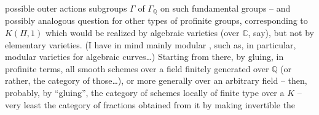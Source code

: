 possible outer actions   subgroups $\Gamma$ of $\Gamma_{\mathbb{Q}}$ on such fundamental groups -- and possibly analogous question for other types of profinite groups, corresponding to $K(\Pi,1)$ which would be realized by algebraic varieties (over $\mathbb{C}$, say), but not by elementary varieties. (I have in mind mainly modular  , such as, in particular, modular varieties for algebraic curves\ldots) Starting from there,   by gluing, in profinite terms, all smooth schemes over a field finitely generated over $\mathbb{Q}$ (or rather, the category of those\ldots), or more generally over an arbitrary field -- then, probably, by ``gluing'', the category of schemes locally of finite type over  a $K$ --  very least the category of fractions obtained from it by  making invertible the
